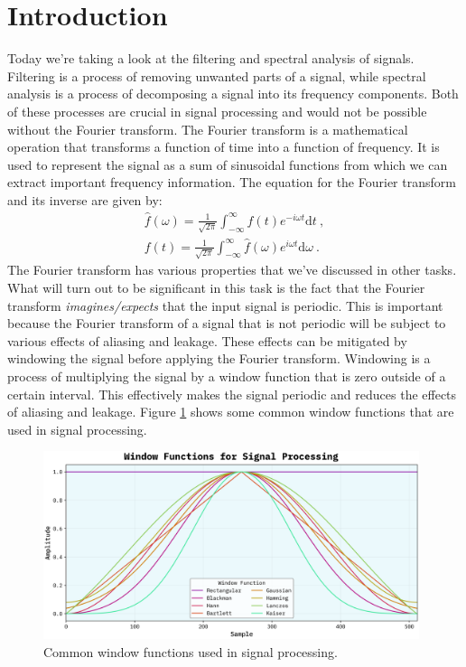 \documentclass[10pt, titlepage, a4paper]{article}
\newcommand{\dd}{\mathrm{d}}
\begin{document}
\section{Introduction}
Today we're taking a look at the filtering and spectral analysis of signals. Filtering is a process of removing unwanted parts of a signal,
while spectral analysis is a process of decomposing a signal into its frequency components. Both of these processes are crucial in signal processing and
would not be possible without the Fourier transform. The Fourier transform is a mathematical operation that transforms a function of time into a
function of frequency. It is used to represent the signal as a sum of sinusoidal functions from which we can extract important frequency information. The
equation for the Fourier transform and its inverse are given by:
%
\begin{gather}
    \hat{f}(\omega) = \frac{1}{\sqrt{2\pi}} \int_{-\infty}^{\infty} f(t) e^{-i\omega t} \dd t\>, \\
    f(t) = \frac{1}{\sqrt{2\pi}} \int_{-\infty}^{\infty} \hat{f}(\omega) e^{i\omega t} \dd \omega\>.~
\end{gather}
%
The Fourier transform has various properties that we've discussed in other tasks. What will turn out to be significant in this task is the fact that
the Fourier transform \textit{imagines/expects} that the input signal is periodic. This is important because the Fourier transform of a signal that is not
periodic will be subject to various effects of aliasing and leakage. These effects can be mitigated by windowing the signal before applying the Fourier
transform. Windowing is a process of multiplying the signal by a window function that is zero outside of a certain interval. This effectively
makes the signal periodic and reduces the effects of aliasing and leakage. Figure \ref{fig:windows} shows some common window functions that are used in
signal processing.

\begin{figure}[H]
    \centering
    \includegraphics[width=0.98\textwidth]{../SpectralAnalysis/Images/window-functions.png}
    \caption{Common window functions used in signal processing.}
    \label{fig:windows}
\end{figure}
\end{document}
